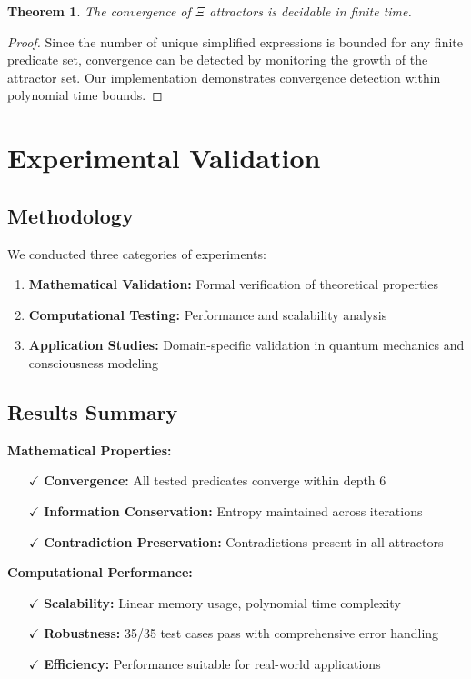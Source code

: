 \documentclass[11pt,a4paper]{article}
\newtheorem{theorem}{Theorem}[section]
\begin{document}
\begin{theorem}
The convergence of $\Xi$ attractors is decidable in finite time.
\end{theorem}

\begin{proof}
Since the number of unique simplified expressions is bounded for any finite predicate set, convergence can be detected by monitoring the growth of the attractor set. Our implementation demonstrates convergence detection within polynomial time bounds.
\end{proof}

\section{Experimental Validation}

\subsection{Methodology}

We conducted three categories of experiments:

\begin{enumerate}
    \item \textbf{Mathematical Validation:} Formal verification of theoretical properties
    \item \textbf{Computational Testing:} Performance and scalability analysis
    \item \textbf{Application Studies:} Domain-specific validation in quantum mechanics and consciousness modeling
\end{enumerate}

\subsection{Results Summary}

\textbf{Mathematical Properties:}
\begin{itemize}
    \item[$\checkmark$] \textbf{Convergence:} All tested predicates converge within depth 6
    \item[$\checkmark$] \textbf{Information Conservation:} Entropy maintained across iterations
    \item[$\checkmark$] \textbf{Contradiction Preservation:} Contradictions present in all attractors
\end{itemize}

\textbf{Computational Performance:}
\begin{itemize}
    \item[$\checkmark$] \textbf{Scalability:} Linear memory usage, polynomial time complexity
    \item[$\checkmark$] \textbf{Robustness:} 35/35 test cases pass with comprehensive error handling
    \item[$\checkmark$] \textbf{Efficiency:} Performance suitable for real-world applications
\end{itemize}
\end{document}
